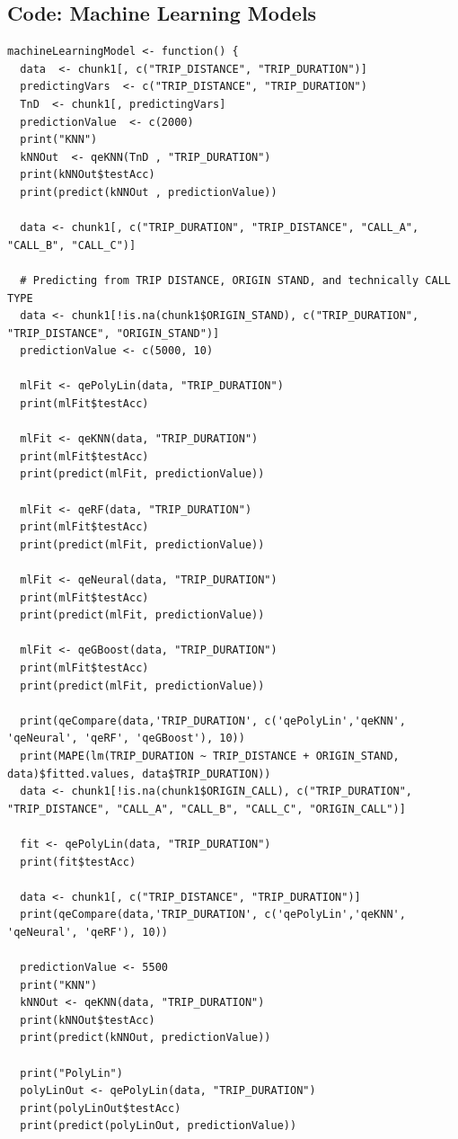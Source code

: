 \documentclass{article}
\numberwithin{equation}{section}
\begin{document}
\subsection{Code: Machine Learning Models} 
\begin{lstlisting}
machineLearningModel <- function() {
  data  <- chunk1[, c("TRIP_DISTANCE", "TRIP_DURATION")]
  predictingVars  <- c("TRIP_DISTANCE", "TRIP_DURATION")
  TnD  <- chunk1[, predictingVars]
  predictionValue  <- c(2000)
  print("KNN")
  kNNOut  <- qeKNN(TnD , "TRIP_DURATION")
  print(kNNOut$testAcc)
  print(predict(kNNOut , predictionValue))

  data <- chunk1[, c("TRIP_DURATION", "TRIP_DISTANCE", "CALL_A", "CALL_B", "CALL_C")]

  # Predicting from TRIP DISTANCE, ORIGIN STAND, and technically CALL TYPE
  data <- chunk1[!is.na(chunk1$ORIGIN_STAND), c("TRIP_DURATION", "TRIP_DISTANCE", "ORIGIN_STAND")]
  predictionValue <- c(5000, 10)

  mlFit <- qePolyLin(data, "TRIP_DURATION")
  print(mlFit$testAcc)

  mlFit <- qeKNN(data, "TRIP_DURATION")
  print(mlFit$testAcc)
  print(predict(mlFit, predictionValue))

  mlFit <- qeRF(data, "TRIP_DURATION")
  print(mlFit$testAcc)
  print(predict(mlFit, predictionValue))

  mlFit <- qeNeural(data, "TRIP_DURATION")
  print(mlFit$testAcc)
  print(predict(mlFit, predictionValue))

  mlFit <- qeGBoost(data, "TRIP_DURATION")
  print(mlFit$testAcc)
  print(predict(mlFit, predictionValue))

  print(qeCompare(data,'TRIP_DURATION', c('qePolyLin','qeKNN', 'qeNeural', 'qeRF', 'qeGBoost'), 10))
  print(MAPE(lm(TRIP_DURATION ~ TRIP_DISTANCE + ORIGIN_STAND, data)$fitted.values, data$TRIP_DURATION))
  data <- chunk1[!is.na(chunk1$ORIGIN_CALL), c("TRIP_DURATION", "TRIP_DISTANCE", "CALL_A", "CALL_B", "CALL_C", "ORIGIN_CALL")]

  fit <- qePolyLin(data, "TRIP_DURATION")
  print(fit$testAcc)

  data <- chunk1[, c("TRIP_DISTANCE", "TRIP_DURATION")]
  print(qeCompare(data,'TRIP_DURATION', c('qePolyLin','qeKNN', 'qeNeural', 'qeRF'), 10))

  predictionValue <- 5500
  print("KNN")
  kNNOut <- qeKNN(data, "TRIP_DURATION")
  print(kNNOut$testAcc)
  print(predict(kNNOut, predictionValue))

  print("PolyLin")
  polyLinOut <- qePolyLin(data, "TRIP_DURATION")
  print(polyLinOut$testAcc)
  print(predict(polyLinOut, predictionValue))


\end{lstlisting}
\end{document}
